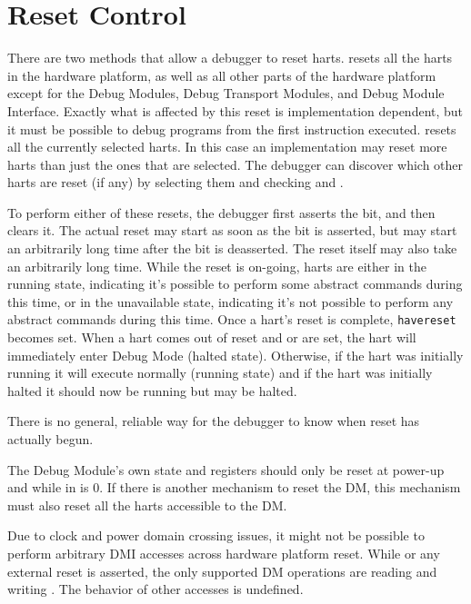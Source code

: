\section{Reset Control} \label{reset}

There are two methods that allow a debugger to reset harts.
\FdmDmcontrolNdmreset resets all the harts in the hardware platform, as well as all other
parts of the hardware platform except for the Debug Modules, Debug Transport Modules,
and Debug Module Interface.
Exactly what is affected by this reset is implementation dependent, but it
must be possible to debug programs from the first instruction executed.
\FdmDmcontrolHartreset resets all the currently selected harts. In this case an
implementation may reset more harts than just the ones that are selected. The
debugger can discover which other harts are reset (if any) by selecting them
and checking \FdmDmstatusAnyhavereset and \FdmDmstatusAllhavereset.

To perform either of these resets, the debugger first asserts the bit, and then
clears it. The actual reset may start as soon as the bit is asserted, but may
start an arbitrarily long time after the bit is deasserted. The reset itself
may also take an arbitrarily long time.  While the reset is
on-going, harts are either in the running state, indicating it's possible to
perform some abstract commands during this time, or in the unavailable state,
indicating it's not possible to perform any abstract commands during this time.
Once a hart's reset is complete, {\tt havereset} becomes set.  When a hart comes out
of reset and \FdmDmcontrolHaltreq or \Fresethaltreq are set, the hart will
immediately enter Debug Mode (halted state).
Otherwise, if the hart was initially running it will execute normally (running state)
and if the hart was initially halted it should now be running but may be halted.

\begin{commentary}
    There is no general, reliable way for the debugger to know when reset has
    actually begun.
\end{commentary}

The Debug Module's own state and registers should only be
reset at power-up and while
\FdmDmcontrolDmactive in \RdmDmcontrol is 0. If there is another mechanism to
reset the DM, this mechanism must also reset all the harts accessible to the
DM.

Due to clock and power domain crossing issues,
it might not be possible to perform arbitrary DMI accesses across
hardware platform reset.
While \FdmDmcontrolNdmreset or any external reset is asserted, the only supported DM
operations are reading and writing \RdmDmcontrol. The behavior of other accesses
is undefined.

